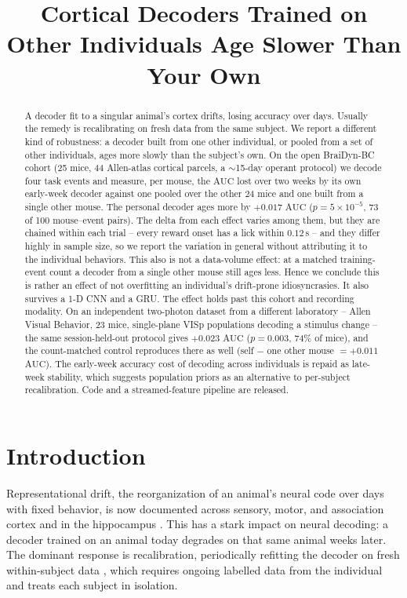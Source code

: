 \documentclass[mlabstract,onecolumn]{jmlr}
\title[Cortical Decoders Age Slower]{Cortical Decoders Trained on Other
Individuals Age Slower Than Your Own}
\author{\Name{Anonymous Author(s)}}
\newcommand{\auc}{\mathrm{AUC}}
\begin{document}
\maketitle

\begin{abstract}
A decoder fit to a singular animal's cortex drifts, losing accuracy over days. Usually the remedy is
recalibrating on fresh data from the same subject. We report a different kind of robustness: a
decoder built from one other individual, or pooled from a set of other individuals, ages more slowly
than the subject's own. On the open BraiDyn-BC cohort (25 mice, 44 Allen-atlas cortical parcels, a
$\sim$15-day operant protocol) we decode four task events and measure, per mouse, the $\auc$ lost
over two weeks by its own early-week decoder against one pooled over the other 24 mice and one built
from a single other mouse. The personal decoder ages more by $+0.017$ $\auc$
($p = 5 \times 10^{-5}$, 73 of 100 mouse--event pairs). The delta from each effect varies among them,
but they are chained within each trial -- every reward onset has a lick within $0.12$\,s -- and they
differ highly in sample size, so we report the variation in general without attributing it to the
individual behaviors. This also is not a data-volume effect: at a matched training-event count a
decoder from a single other mouse still ages less. Hence we conclude this is rather an effect of not
overfitting an individual's drift-prone idiosyncrasies. It also survives a 1-D CNN and a GRU. The
effect holds past this cohort and recording modality. On an independent two-photon dataset from a
different laboratory -- Allen Visual Behavior, 23 mice, single-plane VISp populations decoding a
stimulus change -- the same session-held-out protocol gives $+0.023$ $\auc$
($p = 0.003$, 74\% of mice), and the count-matched control reproduces there as well
(self $-$ one other mouse $= +0.011$ $\auc$). The
early-week accuracy cost of decoding across individuals is repaid as late-week stability, which
suggests population priors as an alternative to per-subject recalibration. Code and a
streamed-feature pipeline are released.
\end{abstract}

\section{Introduction}
Representational drift, the reorganization of an animal's neural code over days with fixed behavior,
is now documented across sensory, motor, and association cortex and in the hippocampus
\citep{rule2020,driscoll2017,schoonover2021}. This has a stark impact on neural decoding: a decoder
trained on an animal today degrades on that same animal weeks later. The dominant response is
recalibration, periodically refitting the decoder on fresh within-subject data
\citep{degenhart2020,jarosiewicz2015}, which requires ongoing labelled data from the individual and
treats each subject in isolation.
\end{document}
